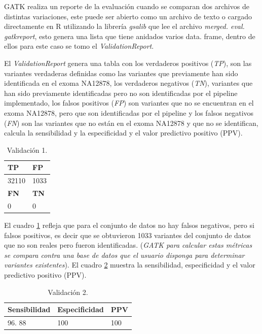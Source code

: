 GATK realiza un reporte de la evaluación cuando se comparan dos archivos de distintas variaciones, este puede ser abierto como un archivo de texto o cargado directamente en R utilizando la librería \textit{gsalib} que lee el archivo \textit{merged. eval. gatkreport}, esto genera una lista que tiene anidados varios data. frame, dentro de ellos para este caso se tomo el \textit{ValidationReport}. 

El \textit{ValidationReport}  genera una tabla con los verdaderos positivos (\textit{TP}), son las variantes verdaderas definidas como las variantes que previamente han sido identificada en el exoma NA12878, los verdaderos negativos (\textit{TN}), variantes que han sido previamente identificadas pero no son identificadas por el pipeline implementado, los falsos positivos (\textit{FP}) son variantes que no se encuentran en el exoma NA12878, pero que son identificadas por el pipeline y los falsos negativos (\textit{FN}) son las variantes que no están en el exoma NA12878 y que no se identifican, calcula la sensibilidad y la especificidad  y el valor predictivo positivo (PPV). 

\begin{table}[H]
	\begin{center}
		\begin{tabular}{|l|l|}
			\hline 
			\textbf{TP} &  \textbf{FP} \\
			\hline 
			32110 & 1033  \\ \hline
			\textbf{FN} &  \textbf{TN} \\
			\hline
			0 &  0\\ \hline
		\end{tabular}
		\caption{Validación 1. }
		\label{tabla:tabla3}
	\end{center}
\end{table}

El cuadro \ref{tabla:tabla3} refleja que para el conjunto de datos no hay falsos negativos, pero si falsos positivos, es decir  que se obtuvieron 1033 variantes del conjunto de datos que no son reales pero fueron identificadas. (\textit{GATK para calcular estas métricas se compara contra una base de datos que el usuario disponga para determinar variantes existentes}). El cuadro \ref{tabla:tabla4} muestra la sensibilidad, especificidad y el valor predictivo positivo (PPV). 

\begin{table}[h]
	\begin{center}
		\begin{tabular}{|l|l|l|}
			\hline 
			\textbf{Sensibilidad} & \textbf{Especificidad} & \textbf{PPV} \\
			\hline 
			96. 88 & 100 & 100 \\ \hline
		\end{tabular}
		\caption{Validación 2.}
		\label{tabla:tabla4}
	\end{center}
\end{table}

